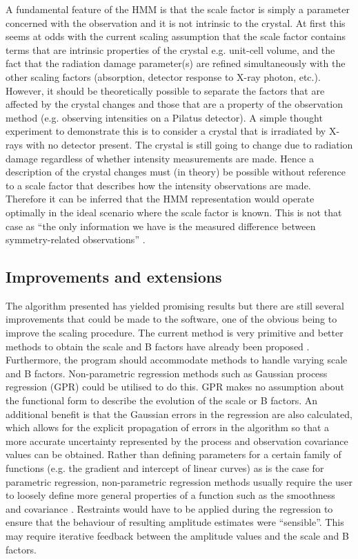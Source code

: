 A fundamental feature of the HMM is that the scale factor is simply a parameter concerned with the observation and it is not intrinsic to the crystal.
At first this seems at odds with the current scaling assumption that the scale factor contains terms that are intrinsic properties of the crystal e.g. unit-cell volume, and the fact that the radiation damage parameter(s) are refined simultaneously with the other scaling factors (absorption, detector response to X-ray photon, etc.).
However, it should be theoretically possible to separate the factors that are affected by the crystal changes and those that are a property of the observation method (e.g. observing intensities on a Pilatus detector).
A simple thought experiment to demonstrate this is to consider a crystal that is irradiated by X-rays with no detector present.
The crystal is still going to change due to radiation damage regardless of whether intensity measurements are made.
Hence a description of the crystal changes must (in theory) be possible without reference to a scale factor that describes how the intensity observations are made.
Therefore it can be inferred that the HMM representation would operate optimally in the ideal scenario where the scale factor is known.
This is not that case as ``the only information we have is the measured difference between symmetry-related observations'' \cite{evans2005}.

\subsection{Improvements and extensions}
\label{sub:Improvements and Extensions}
The algorithm presented has yielded promising results but there are still several improvements that could be made to the software, one of the obvious being to improve the scaling procedure.
The current method is very primitive and better methods to obtain the scale and B factors have already been proposed \cite{popov2003}.
Furthermore, the program should accommodate methods to handle varying scale and B factors.
Non-parametric regression methods such as Gaussian process regression (GPR) could be utilised to do this.
GPR makes no assumption about the functional form to describe the evolution of the scale or B factors.
An additional benefit is that the Gaussian errors in the regression are also calculated, which allows for the explicit propagation of errors in the algorithm so that a more accurate uncertainty represented by the process and observation covariance values can be obtained.
Rather than defining parameters for a certain family of functions (e.g. the gradient and intercept of linear curves) as is the case for parametric regression, non-parametric regression methods usually require the user to loosely define more general properties of a function such as the smoothness and covariance \cite{rasmussen2006gaussian}.
Restraints would have to be applied during the regression to ensure that the behaviour of resulting amplitude estimates were ``sensible''.
This may require iterative feedback between the amplitude values and the scale and B factors.

